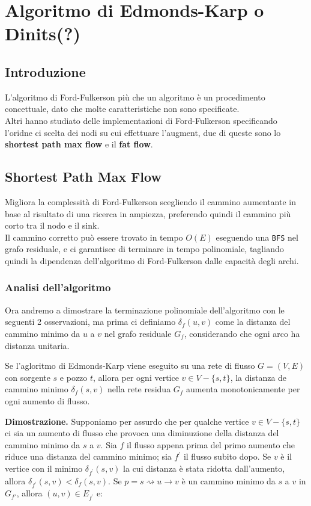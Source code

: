 \chapter{Algoritmo di Edmonds-Karp o Dinits(?)}
\section{Introduzione}
L'algoritmo di Ford-Fulkerson più che un algoritmo è un procedimento concettuale, dato che molte caratteristiche non sono specificate.\\

Altri hanno studiato delle implementazioni di Ford-Fulkerson specificando l'oridne ci scelta dei nodi su cui effettuare l'augment, due di queste sono lo \textbf{shortest path max flow} e il \textbf{fat flow}.


\section{Shortest Path Max Flow}
Migliora la complessità di Ford-Fulkerson scegliendo il cammino aumentante in base al risultato di una ricerca in ampiezza, preferendo quindi il cammino più corto tra il nodo e il sink.\\

Il cammino corretto può essere trovato in tempo $O(E)$ eseguendo una \texttt{BFS} nel grafo residuale, e ci garantisce di terminare in tempo polinomiale, tagliando quindi la dipendenza dell'algoritmo di Ford-Fulkerson dalle capacità degli archi.

\subsection{Analisi dell'algoritmo}
Ora andremo a dimostrare la terminazione polinomiale dell'algoritmo con le seguenti 2 osservazioni, ma prima ci definiamo $\delta_f(u,v)$ come la distanza del cammino minimo da $u$ a $v$ nel grafo residuale $G_f$, considerando che ogni arco ha distanza unitaria.

\begin{myblockquote}
    Se l'agloritmo di Edmonds-Karp viene eseguito su una rete di flusso $G = (V, E)$ con sorgente $s$ e pozzo $t$, allora per ogni vertice $v \in V - \{s,t\}$, la distanza de cammino minimo $\delta_f(s,v)$ nella rete residua $G_f$ aumenta monotonicamente per ogni aumento di flusso.
\end{myblockquote}

\textbf{Dimostrazione.} Supponiamo per assurdo che per qualche vertice $v \in V - \{s, t\}$ ci sia un aumento di flusso che provoca una diminuzione della distanza del cammino minimo da $s$ a $v$. Sia $f$ il flusso appena prima del primo aumento che riduce una distanza del cammino minimo;
sia $f^{'}$ il flusso subito dopo. Se $v$ è il vertice con il minimo $\delta_{f^{'}}(s,v)$ la cui distanza è stata ridotta dall'aumento, allora $\delta_{f^{'}}(s,v) < \delta_{f}(s,v)$.
Se $p = s \rightsquigarrow u \rightarrow v$ è un cammino minimo da $s$ a $v$ in $G_{f{'}}$, allora 
$(u,v) \in E_{f^{'}}$ e:

